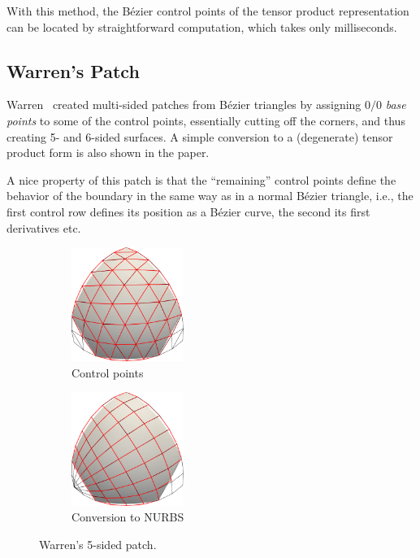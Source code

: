 \documentclass[9pt,academicons]{article}
\begin{document}
With this method, the B\'ezier control points of the tensor product representation
can be located by straightforward computation, which takes only milliseconds.

\subsection{Warren's Patch}
\label{subsec:warren}
Warren~\cite{Warren:1992} created multi-sided patches from B\'ezier triangles by assigning $0/0$
\emph{base points} to some of the control points, essentially cutting off the corners, and thus
creating 5- and 6-sided surfaces. A simple conversion to a (degenerate) tensor product form is
also shown in the paper.

A nice property of this patch is that the ``remaining'' control points define the behavior of the
boundary in the same way as in a normal B\'ezier triangle, i.e., the first control row defines
its position as a B\'ezier curve, the second its first derivatives etc.
\begin{figure}[h!]
  \begin{subfigure}{0.50\textwidth}
    \centering
    \includegraphics[width = 0.4\textwidth]{images/warren-cnet.png}
    \caption{Control points}
    \label{fig:warren-cnet}
  \end{subfigure}
  \begin{subfigure}{0.50\textwidth}
    \centering
    \includegraphics[width = 0.4\textwidth]{images/warren-quad.png}
    \caption{Conversion to NURBS}
    \label{fig:warren-cnet}
  \end{subfigure}
  \caption{Warren's 5-sided patch.}
  \label{fig:warren}
\end{figure}
\end{document}
